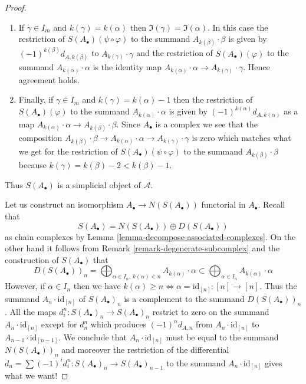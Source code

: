 \begin{proof}
\begin{enumerate}
\begin{enumerate}
again both restrictions are zero and we get agreement.
\item If $\gamma \in I_m$ and $k(\gamma) = k(\alpha)$ then
$\Im(\gamma) = \Im(\alpha)$. In this case
the restriction of $S(A_\bullet)(\psi \circ \varphi)$
to the summand $A_{k(\beta)} \cdot \beta$ is given by
$(-1)^{k(\beta)}d_{A, k(\beta)}$ to $A_{k(\gamma)} \cdot \gamma$
and the restriction of $S(A_\bullet)(\varphi)$ to the summand
$A_{k(\alpha)} \cdot \alpha$ is the identity map
$A_{k(\alpha)} \cdot \alpha \to A_{k(\gamma)} \cdot \gamma$.
Hence agreement holds.
\item Finally, if $\gamma \in I_m$ and $k(\gamma) = k(\alpha) - 1$ then
the restriction of $S(A_\bullet)(\varphi)$ to the summand
$A_{k(\alpha)} \cdot \alpha$ is given by $(-1)^{k(\alpha)} d_{A, k(\alpha)}$
as a map
$A_{k(\alpha)} \cdot \alpha \to A_{k(\beta)} \cdot \beta$.
Since $A_\bullet$ is a complex we see that the composition
$A_{k(\beta)} \cdot \beta \to
A_{k(\alpha)} \cdot \alpha \to A_{k(\gamma)} \cdot \gamma$ is zero
which matches what we get for the restriction of
$S(A_\bullet)(\psi \circ \varphi)$
to the summand $A_{k(\beta)} \cdot \beta$
because $k(\gamma) = k(\beta) - 2 < k(\beta) - 1$.
\end{enumerate}
\end{enumerate}
Thus $S(A_\bullet)$ is a simplicial object of $\mathcal{A}$.

\medskip\noindent
Let us construct an isomorphism $A_\bullet \to N(S(A_\bullet))$
functorial in $A_\bullet$. Recall that
$$
S(A_\bullet) =  N(S(A_\bullet)) \oplus D(S(A_\bullet))
$$
as chain complexes by Lemma \ref{lemma-decompose-associated-complexes}.
On the other hand it follows from Remark \ref{remark-degenerate-subcomplex}
and the construction of $S(A_\bullet)$ that
$$
D(S(A_\bullet))_n =
\bigoplus\nolimits_{\alpha \in I_n,\ k(\alpha) < n} A_{k(\alpha)} \cdot \alpha
\subset
\bigoplus\nolimits_{\alpha \in I_n} A_{k(\alpha)} \cdot \alpha
$$
However, if $\alpha \in I_n$ then we have
$k(\alpha) \geq n \Leftrightarrow \alpha = \text{id}_{[n]} : [n] \to [n]$.
Thus the summand $A_n \cdot \text{id}_{[n]}$ of $S(A_\bullet)_n$
is a complement to the summand $D(S(A_\bullet))_n$.
All the maps $d^n_i : S(A_\bullet)_n \to S(A_\bullet)_n$
restrict to zero on the summand $A_n \cdot \text{id}_{[n]}$
except for $d^n_n$ which produces $(-1)^n d_{A, n}$
from $A_n \cdot \text{id}_{[n]}$ to $A_{n - 1} \cdot \text{id}_{[n - 1]}$.
We conclude that $A_n \cdot \text{id}_{[n]}$ must be
equal to the summand $N(S(A_\bullet))_n$ and moreover
the restriction of the differential
$d_n = \sum (-1)^id^n_i : S(A_\bullet)_n \to S(A_\bullet)_{n - 1}$
to the summand $A_n \cdot \text{id}_{[n]}$ gives what we want!


\end{proof}
